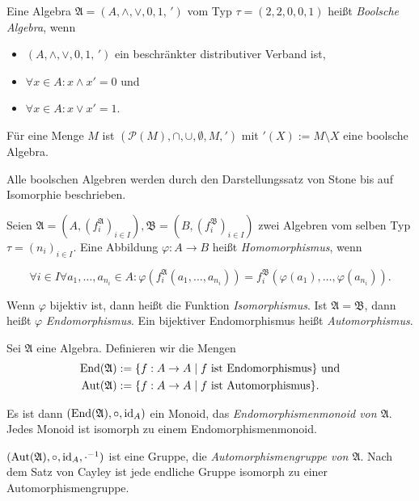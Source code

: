\begin{definition}
    Eine Algebra $\mathfrak{A} = (A, \wedge, \vee, 0, 1, \,')$ vom Typ $\tau = (2,2,0,0,1)$ heißt \emph{Boolsche Algebra}, wenn
    \begin{itemize}[topsep=0pt, label={--}]
        \item $(A, \wedge, \vee, 0, 1, \,')$ ein beschränkter distributiver Verband ist,
        \item $\forall x \in A: x \wedge x' = 0$ und
        \item $\forall x \in A: x \vee x' = 1$.
    \end{itemize}
\end{definition}

\begin{example}
    Für eine Menge $M$ ist $(\mathcal{P}(M), \cap, \cup, \emptyset, M, ')$ mit $'(X) := M \setminus X$ eine boolsche Algebra.
\end{example}

\begin{remark}
    Alle boolschen Algebren werden durch den Darstellungssatz von Stone bis auf Isomorphie beschrieben.
\end{remark}

\begin{definition}
    Seien $\mathfrak{A} = (A, (f_i^\mathfrak{A})_{i \in I}), \mathfrak{B} = (B, (f_i^\mathfrak{B})_{i \in I})$ zwei Algebren vom selben Typ $\tau = (n_i)_{i \in I}$. Eine Abbildung $\varphi: A \to B$ heißt \emph{Homomorphismus}, wenn

    $$\forall i \in I \forall a_1, \ldots, a_{n_i} \in A: \varphi(f_i^\mathfrak{A}(a_1, \ldots, a_{n_i})) = f_i^\mathfrak{B}(\varphi(a_1), \ldots, \varphi(a_{n_i})). $$

    Wenn $\varphi$ bijektiv ist, dann heißt die Funktion \emph{Isomorphismus}.
    Ist $\mathfrak{A} = \mathfrak{B}$, dann heißt $\varphi$ \emph{Endomorphismus}. Ein bijektiver Endomorphismus heißt \emph{Automorphismus}.
\end{definition}

\begin{example}
    Sei $\mathfrak{A}$ eine Algebra. Definieren wir die Mengen \begin{align*}
        \operatorname{End}(\mathfrak{A}) &:= \{f: A \to A \mid f\text{ ist Endomorphismus}\} \text{ und} \\ \operatorname{Aut}(\mathfrak{A}) &:= \{f: A \to A \mid f\text{ ist Automorphismus}\}.
    \end{align*}

    Es ist dann $(\operatorname{End}(\mathfrak{A}), \circ, \operatorname{id}_A)$ ein Monoid, das \emph{Endomorphismenmonoid von $\mathfrak{A}$}. Jedes Monoid ist isomorph zu einem Endomorphismenmonoid.
    
    $(\operatorname{Aut}(\mathfrak{A}), \circ, \operatorname{id}_A, \cdot^{-1})$ ist eine Gruppe, die \emph{Automorphismengruppe von $\mathfrak{A}$}. Nach dem Satz von Cayley ist jede endliche Gruppe isomorph zu einer Automorphismengruppe.
\end{example}